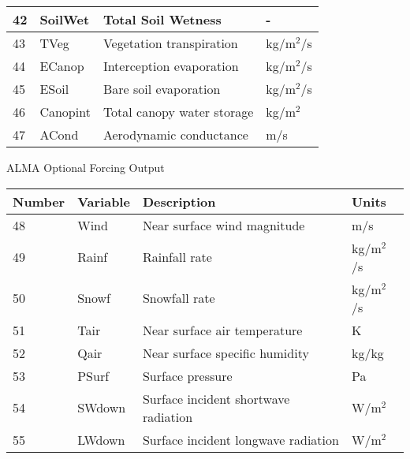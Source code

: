 \begin{tabular}{|l|l|l|l|}
42 & SoilWet      & Total Soil Wetness             & -             \\ \hline
43 & TVeg         & Vegetation transpiration       & kg/m$^2$/s    \\ \hline
44 & ECanop       & Interception evaporation       & kg/m$^2$/s    \\ \hline
45 & ESoil        & Bare soil evaporation          & kg/m$^2$/s    \\ \hline
46 & Canopint     & Total canopy water storage     & kg/m$^2$      \\ \hline
47 & ACond        & Aerodynamic conductance        & m/s           \\ \hline
\end{tabular}

\newpage

ALMA Optional Forcing Output

\begin{tabular}{|l|l|l|l|} \hline
Number & Variable & Description                     & Units         \\ \hline
48 & Wind   & Near surface wind magnitude           & m/s           \\ \hline
49 & Rainf  & Rainfall rate                         & kg/m$^2$/s    \\ \hline
50 & Snowf  & Snowfall rate                         & kg/m$^2$/s    \\ \hline
51 & Tair   & Near surface air temperature          & K             \\ \hline
52 & Qair   & Near surface specific humidity        & kg/kg         \\ \hline
53 & PSurf  & Surface pressure                      & Pa            \\ \hline
54 & SWdown & Surface incident shortwave radiation  & W/m$^2$       \\ \hline
55 & LWdown & Surface incident longwave radiation   & W/m$^2$       \\ \hline
\end{tabular}

\setlength{\extrarowheight}{0pt}

